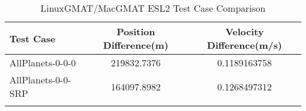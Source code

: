 \begin{table}[htbp!]
\centering
\caption{ LinuxGMAT/MacGMAT ESL2 Test Case Comparison}
      \begin{tabular}{lcc}
      \hline\hline
          Test Case & Position Difference(m) & Velocity Difference(m/s) \\
         \hline
         AllPlanets-0-0-0 & 219832.7376 & 0.1189163758 \\
         AllPlanets-0-0-SRP & 164097.8982 & 0.1268497312 \\
      \hline\hline
      \label{Table: ESL2 LinuxGMAT-MacGMAT Table} 
\end{tabular}
\end{table}
